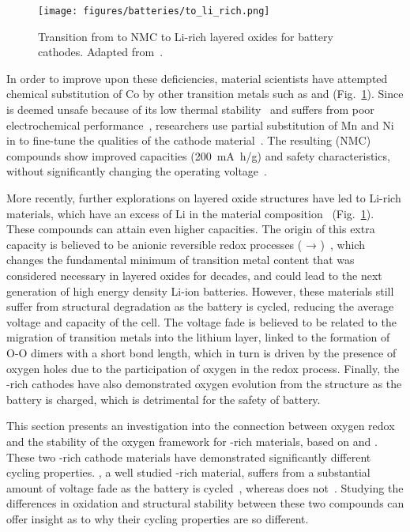 \begin{refsection}
\begin{figure}[ht] 
\centering 
\captionsetup{width=0.9\linewidth}
\texttt{[image: figures/batteries/to\_li\_rich.png]} 
\caption{Transition from  to NMC to Li-rich layered oxides for 
battery cathodes. Adapted from~\cite{Rozier2015}.} 
\label{batteries:fig-Lirich_transition} 
\end{figure} 
 
In order to improve upon these deficiencies, material scientists have 
attempted chemical substitution of Co by other transition metals such as 
 and  (Fig.~\ref{batteries:fig-Lirich_transition}). Since 
 is deemed unsafe because of its low thermal 
stability~\cite{Ohzuku1993} and  suffers from poor electrochemical 
performance~\cite{Vitins1997}, researchers use partial substitution of Mn and 
Ni in  to fine-tune the qualities of the cathode 
material~\cite{Koyama2003}. The resulting  (NMC) 
compounds show improved capacities (200~\si{\milli\ampere\hour/\gram}) and 
safety characteristics, without significantly changing the operating 
voltage~\cite{Zhou2011}.  
 
More recently, further explorations on layered oxide structures have led to 
Li-rich materials, which have an excess of Li in the material 
composition~\cite{Thackeray2007} (Fig.~\ref{batteries:fig-Lirich_transition}). 
These compounds can attain even higher capacities. The origin of this extra 
capacity is believed to be anionic reversible redox processes ( → 
)~\cite{Sathiya2013}, which changes the fundamental minimum of 
transition metal content that was considered necessary in layered oxides for 
decades, and could lead to the next generation of high energy density Li-ion 
batteries. However, these materials still suffer from structural degradation 
as the battery is cycled, reducing the average voltage and capacity of the 
cell. The voltage fade is believed to be related to the migration of 
transition metals into the lithium layer, linked to the formation of O-O 
dimers with a short bond length, which in turn is driven by the presence of 
oxygen holes due to the participation of oxygen in the redox process. Finally, 
the -rich cathodes have also demonstrated oxygen evolution from the 
structure as the battery is charged, which is detrimental for the safety of 
battery. 
 
This section presents an investigation into the connection between oxygen 
redox and the stability of the oxygen framework for -rich materials, 
based on  and . These two -rich cathode 
materials have demonstrated significantly different cycling properties. 
, a well studied -rich material, suffers from a substantial 
amount of voltage fade as the battery is cycled~\cite{Croy2014}, whereas 
 does not~\cite{McCalla2015}. Studying the differences in 
oxidation and structural stability between these two compounds can offer 
insight as to why their cycling properties are so different.  
 

\end{refsection}
